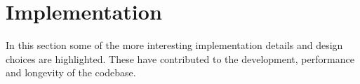 \section{Implementation}

In this section some of the more interesting implementation details and design choices are highlighted. These have contributed to the development, performance and longevity of the codebase.




